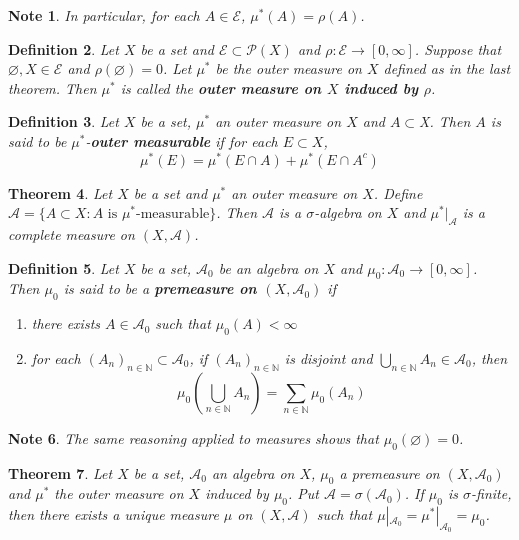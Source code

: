 \documentclass[12pt]{amsart}
\newtheorem{thm}{Theorem}[subsection]
\newtheorem{defn}[thm]{Definition}
\newtheorem{note}[thm]{Note}
\newcommand{\sig}{\sigma}
\newcommand{\N}{\mathbb{N}}
\newcommand{\MA}{\mathcal{A}}
\newcommand{\MP}{\mathcal{P}}
\newcommand{\ME}{\mathcal{E}}
\begin{document}
\begin{note}
	In particular, for each $A \in \ME$, $\mu^*(A) = \rho(A)$.
\end{note}

\begin{defn}
	Let $X$ be a set and $\ME \subset \MP(X)$ and $\rho: \ME \rightarrow [0, \infty]$. Suppose that $\varnothing, X \in \ME$ and $\rho(\varnothing) = 0$. Let $\mu^*$ be the outer measure on $X$ defined as in the last theorem. Then $\mu^*$ is called the \textbf{outer measure on $X$ induced by $\rho$}.
\end{defn}

\begin{defn}
	Let $X$ be a set, $\mu^*$ an outer measure on $X$ and $A \subset $X. Then $A$ is said to be $\mu^*$-\textbf{outer measurable} if for each $E \subset X$, $$\mu^*(E) = \mu^*(E \cap A) + \mu^*(E \cap A^c)$$ 
\end{defn}

\begin{thm}
	Let $X$ be a set and $\mu^*$ an outer measure on $X$. Define $\MA = \{A \subset X: A \text{ is }\mu^*\text{-measurable}\}$. Then $\MA$ is a $\sig$-algebra on $X$ and $\mu^*|_{\MA}$ is a complete measure on $(X, \MA)$.
\end{thm}

\begin{defn}
	Let $X$ be a set, $\MA_0$ be an algebra on $X$ and $\mu_0:\MA_0 \rightarrow [0, \infty]$. Then $\mu_0$ is said to be a \textbf{premeasure on $(X,\MA_0)$} if 
	\begin{enumerate}
		\item there exists $A \in \MA_0$ such that $\mu_0(A)< \infty$
		\item for each $(A_n)_{n \in \N} \subset \MA_0$, if $(A_n)_{n \in \N}$ is disjoint and $\bigcup\limits_{n \in \N}A_n \in \MA_0$, then $$\mu_0(\bigcup_{n\in \N}A_n) = \sum_{n \in \N}\mu_0(A_n)$$
	\end{enumerate}
\end{defn}

\begin{note}
	The same reasoning applied to measures shows that $\mu_0(\varnothing) = 0$.
\end{note}

\begin{thm}
	Let $X$ be a set, $\MA_0$ an algebra on $X$, $\mu_0$ a premeasure on $(X,\MA_0)$ and $\mu^*$ the outer measure on $X$ induced by $\mu_0$. Put $\MA = \sig(\MA_0)$. If $\mu_0$ is $\sig$-finite, then there exists a unique measure $\mu$ on $(X, \MA)$ such that $\mu|_{\MA_0} = \mu^*|_{\MA_0} = \mu_0$. 
\end{thm}
\end{document}
